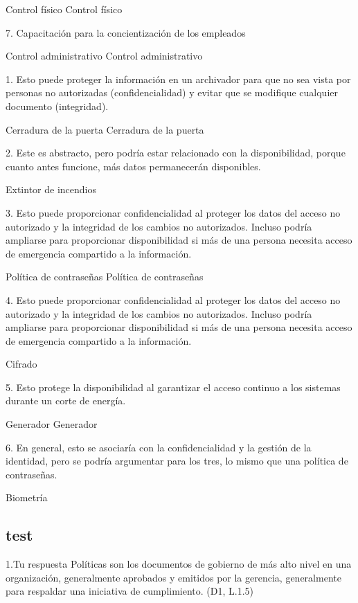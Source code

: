 Control físico
   Control físico

7. Capacitación para la concientización de los empleados


Control administrativo
    Control administrativo


1. Esto puede proteger la información en un archivador para que no sea vista por personas no autorizadas (confidencialidad) y evitar que se modifique cualquier documento (integridad).


Cerradura de la puerta
   Cerradura de la puerta

2. Este es abstracto, pero podría estar relacionado con la disponibilidad, porque cuanto antes funcione, más datos permanecerán disponibles. 



   Extintor de incendios

3. Esto puede proporcionar confidencialidad al proteger los datos del acceso no autorizado y la integridad de los cambios no autorizados. Incluso podría ampliarse para proporcionar disponibilidad si más de una persona necesita acceso de emergencia compartido a la información. 


Política de contraseñas
   Política de contraseñas

4. Esto puede proporcionar confidencialidad al proteger los datos del acceso no autorizado y la integridad de los cambios no autorizados. Incluso podría ampliarse para proporcionar disponibilidad si más de una persona necesita acceso de emergencia compartido a la información.



   Cifrado

5. Esto protege la disponibilidad al garantizar el acceso continuo a los sistemas durante un corte de energía.


Generador
   Generador

6. En general, esto se asociaría con la confidencialidad y la gestión de la identidad, pero se podría argumentar para los tres, lo mismo que una política de contraseñas. 



   Biometría

   \subsection{test}
1.Tu respuesta
Políticas
son los documentos de gobierno de más alto nivel en una organización, generalmente aprobados y emitidos por la gerencia, generalmente para respaldar una iniciativa de cumplimiento. (D1, L.1.5)

